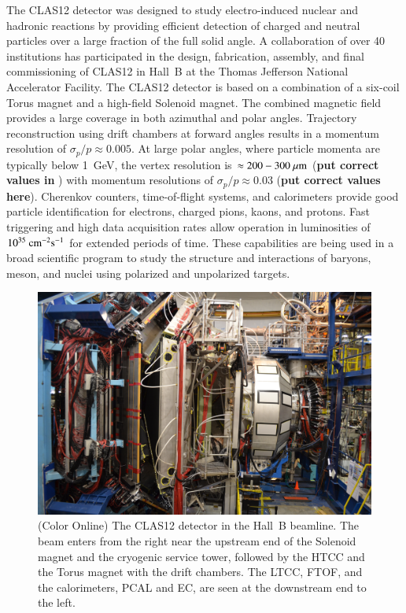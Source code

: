 \documentclass[final,3p,twocolumn]{elsarticle}
\begin{document}
The CLAS12 detector was designed to study electro-induced nuclear and hadronic reactions by providing efficient
detection of charged and neutral particles over a large fraction of the full solid angle. A collaboration of over 40
institutions has participated in the design, fabrication, assembly, and final commissioning of CLAS12 in Hall~B at the
Thomas Jefferson  National Accelerator Facility. The CLAS12 detector is based on a combination of a six-coil Torus
magnet and a high-field Solenoid magnet. The combined magnetic field provides a large coverage in both azimuthal and
polar angles. Trajectory reconstruction using drift chambers at forward angles results in a momentum resolution of
${\sigma_p / p} \approx 0.005$. At large polar angles, where particle momenta are typically below 1~GeV, the vertex
resolution is $\approx 200-300~\mu\rm{m}$ ({\bf put correct values in} ) with momentum resolutions of
$\sigma_p / p \approx 0.03$  ({\bf put correct values here}).  Cherenkov counters, time-of-flight systems, and
calorimeters provide good particle identification for electrons, charged pions, kaons, and protons. Fast triggering and
high data acquisition rates allow operation in luminosities of $10^{35}~\rm{cm}^{-2}\rm{s}^{-1}$ for extended periods of
time. These capabilities are being used in a broad scientific program to study the structure and interactions of baryons,
meson, and nuclei using polarized and unpolarized targets. 

\begin{figure}[bhtp!]
\centerline{\includegraphics[width=1.4\columnwidth]{CLAS12_photo-1.jpg}}
\caption{(Color Online) The CLAS12 detector in the Hall~B beamline. The beam enters from the right near the upstream end of the
Solenoid magnet and the cryogenic service tower, followed by the HTCC and the Torus magnet with the drift chambers.
The LTCC, FTOF, and the calorimeters, PCAL and EC, are seen at the downstream end to the left.}
\label{clas12-photo}
\end{figure}
\end{document}
